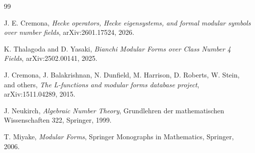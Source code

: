 \documentclass[11pt]{article}
\begin{document}
\begin{thebibliography}{99}

J. E. Cremona,
\emph{Hecke operators, Hecke eigensystems, and formal modular symbols over number fields},
arXiv:2601.17524, 2026.

K. Thalagoda and D. Yasaki,
\emph{Bianchi Modular Forms over Class Number 4 Fields},
arXiv:2502.00141, 2025.

J. Cremona, J. Balakrishnan, N. Dunfield, M. Harrison, D. Roberts, W. Stein, and others,
\emph{The L-functions and modular forms database project},
arXiv:1511.04289, 2015.

J. Neukirch,
\emph{Algebraic Number Theory},
Grundlehren der mathematischen Wissenschaften 322, Springer, 1999.

T. Miyake,
\emph{Modular Forms},
Springer Monographs in Mathematics, Springer, 2006.

\end{thebibliography}
\end{document}

